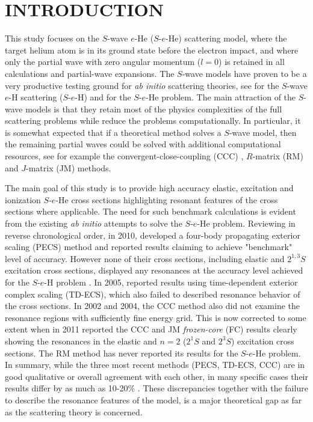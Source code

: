 \documentclass[aip
, pra
, showpacs
, aps
, twocolumn
, groupedaddress
, floatfix
]{revtex4}
\begin{document}
\section{INTRODUCTION}


This study focuses on the $S$-wave $e$-He ($S$-$e$-He) scattering model,
where the target helium atom is in its ground state before the electron impact,
and where only the partial wave with zero angular momentum ($l=0$) is retained in all calculations
and partial-wave expansions.
The $S$-wave models have proven to be a very productive testing ground for {\it ab initio} scattering theories,
see \cite{T62,HY74p1209,P78,P80,P81,CO84,BS92p53,BST93,KM94pL407,IDHF95,PS96,JS02,JS00l,BRIM99,S99l,MHR02,BS04,Frapiccini10} for the $S$-wave $e$-H scattering ($S$-$e$-H)
and \cite{DHIF94,PMR99,PBFS02,PNBFS04,HMR05R,HMR05,BS10p022715,BS10p022716,KFB11} for  the $S$-$e$-He problem.
The main attraction of the $S$-wave models is that they retain most of the physics complexities of the full
scattering problems while reduce the problems computationally.
In particular, it is somewhat expected that if a theoretical method solves a $S$-wave model, then
the remaining partial waves could be solved with additional computational resources,
see for example the convergent-close-coupling (CCC) \cite{FB95},
$R$-matrix (RM) \cite{FLRS94b, PhysRevA.54.R998, SMC2006}
and $J$-matrix (JM) \cite{KM94pL741,KM95pL139} methods.


The main goal of this study is to provide high accuracy elastic, excitation and ionization $S$-$e$-He cross sections highlighting resonant features of the cross sections where applicable.
The need for such benchmark calculations is evident from the existing {\em ab initio} attempts to solve the $S$-$e$-He problem.
Reviewing in reverse chronological order, in 2010, \citet{BS10p022715} developed a four-body propagating exterior scaling (PECS) method and reported results claiming to achieve "benchmark" level of accuracy.
However none of their cross sections, including elastic and $2^{1,3}S$ excitation cross sections, displayed any resonances at the accuracy level achieved for the $S$-$e$-H problem \cite{P78}.
In 2005, \citet{HMR05} reported results using
time-dependent exterior complex scaling (TD-ECS), which also failed to described resonance behavior of the cross sections.
In 2002 and 2004, the CCC method \cite{PBFS02,PNBFS04} also did not examine the resonance regions with sufficiently fine energy grid.
This is now corrected to some extent when in 2011 \citet{KFB11} reported the CCC and JM {\em frozen-core}
(FC) results clearly showing the resonances in the elastic and $n=2$ ($2^1S$ and $2^3S$) excitation cross sections.
The RM method \cite{FLRS94b, SMC2006} has never reported its results for the $S$-$e$-He problem.
In summary, while the three most recent methods (PECS, TD-ECS, CCC) are in good qualitative or overall agreement with each other,
in many specific cases their results differ by as much as 10-20\% \cite{BS10p022715,HMR05}.
These discrepancies together with the failure to describe the resonance features of the model,
is a major theoretical gap as far as the scattering theory is concerned.
\end{document}
